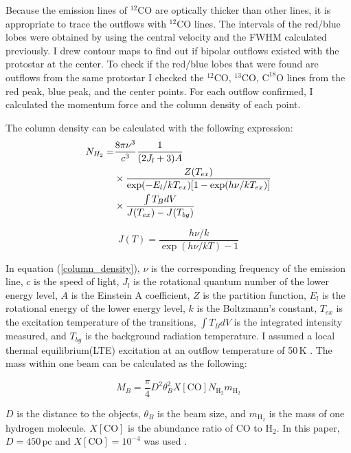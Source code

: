 Because the emission lines of $^{12}$CO are optically thicker than other lines, it is appropriate to trace the outflows with $^{12}$CO lines. The intervals of the red/blue lobes were obtained by using the central velocity and the FWHM calculated previously. I drew contour maps to find out if bipolar outflows existed with the protostar at the center. To check if the red/blue lobes that were found are outflows from the same protostar I checked the $^{12}$CO, $^{13}$CO, $\textrm{C}^{18}\textrm{O}$ lines from the red peak, blue peak, and the center points. For each outflow confirmed, I calculated the momentum force and the column density of each point.

The column density can be calculated with the following expression:
\begin{align}
	N_{H_2} =& \frac{8\pi \nu^3}{c^3} \frac{1}{(2J_l +3)A}  \notag \\
	& \times \frac{Z(T_{ex})}{\exp(-E_l / kT_{ex})[1-\exp(h\nu / kT_{ex})]} \notag \\
	& \times \frac{\int T_B dV}{J(T_{ex})-J(T_{bg})} \label{column_density}
\end{align}

\begin{equation}
J(T) = \frac{h \nu / k}{\exp(h\nu / kT)-1}
\end{equation}

In equation (\ref{column_density}), $\nu$ is the corresponding frequency of the emission line, $c$ is the speed of light, $J_l$ is the rotational quantum number of the lower energy level, $A$ is the Einstein A coefficient, $Z$ is the partition function, $E_l$ is the rotational energy of the lower energy level, $k$ is the Boltzmann's constant, $T_{ex}$ is the excitation temperature of the transitions, $\int T_B dV$ is the integrated intensity measured, and $T_{bg}$ is the background radiation temperature. I assumed a local thermal equilibrium(LTE) excitation at an outflow temperature of 50$\,$K \cite{takahashi2008millimeter}.
The mass within one beam can be calculated as the following:

\begin{equation}
M_B =  \frac{\pi}{4} D^2 \theta_B ^2 X[\textrm{CO}] N_{\textrm{H}_2} m_{\textrm{H}_2} \label{beam_mass}
\end{equation}

$D$ is the distance to the objects, $\theta_B$ is the beam size, and $m_{\textrm{H}_2}$ is the mass of one hydrogen molecule. $X[\textrm{CO}]$ is the abundance ratio of CO to $\textrm{H}_2$. In this paper, $D = 450\,\textrm{pc}$ and $X[\textrm{CO}] = 10^{-4}$ was used \cite{hatchell2007star}.\\

